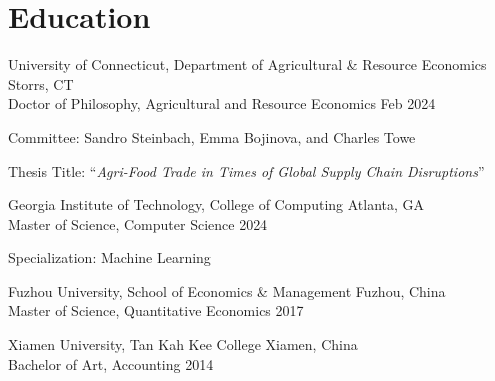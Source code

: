 \documentclass[10.5 pt,letterpaper]{article}
\renewenvironment{itemize}{
	\begin{list}{}{
			\setlength{\leftmargin}{1.5em}
		}
	}{
	\end{list}
}
\begin{document}
	\section*{\textbf{ Education}}
	\begin{itemize}
		\item[-]  University of Connecticut, Department of Agricultural \& Resource Economics  \hfill Storrs, CT \\
	 Doctor of Philosophy, Agricultural and Resource Economics  \hfill  Feb  2024  
	
			
			Committee:	 	 Sandro Steinbach,	Emma Bojinova, and Charles Towe 
			
			Thesis Title: ``\textit{Agri-Food Trade in Times of Global Supply Chain Disruptions}''
 
		 
	
		 \item[-]    Georgia Institute of Technology, College of  Computing \hfill   Atlanta, GA   \\ 
		 Master of Science, Computer Science  \hfill      2024  
 
	Specialization: Machine Learning
 
		\item[-]  Fuzhou University, School of Economics \& Management \hfill Fuzhou, China \\ 
		Master of Science,   Quantitative Economics  \hfill    2017
		
 
		\item[-]  Xiamen University, Tan Kah Kee College    \hfill  Xiamen, China \\
		Bachelor of Art,  Accounting \hfill    2014
 
	\end{itemize}
	
 
 
\end{document}
